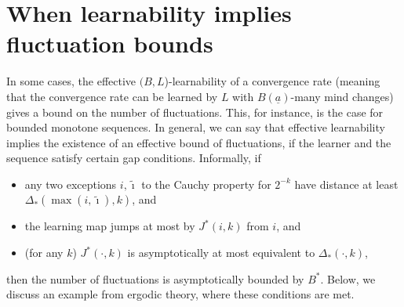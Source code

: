 \documentclass[1p]{elsarticle}
\theoremstyle{plain}
\theoremstyle{definition}
\theoremstyle{remark}
\theoremstyle{definition}
\begin{document}
{\section{When learnability implies fluctuation bounds}


In some cases, the effective $(B,L$)-learnability of a convergence rate 
(meaning that the convergence rate can be learned by $L$ with 
$B(\underline{a})$-many mind 
changes) gives a bound on the number of fluctuations. This, for instance, 
is the case for bounded monotone sequences. In general, we can say that
effective learnability implies the existence of an
effective bound of fluctuations, if the learner and the sequence satisfy
certain gap conditions. Informally, if
\begin{itemize}
\item any two exceptions $i,\tilde{\imath}$ to the Cauchy property for $2^{-k}$ have distance at least $\Delta_*(\max(i,\tilde{\imath}),k)$, and
\item the learning map jumps at most by $J^*(i,k)$ from $i$, and
\item (for any $k$) $J^*(\cdot, k)$ is asymptotically at most equivalent to $\Delta_*(\cdot, k)$, 
\end{itemize}
then the number of fluctuations is asymptotically bounded by $B^*$. Below, we discuss an example from ergodic theory, where these conditions are met.

}
\end{document}
